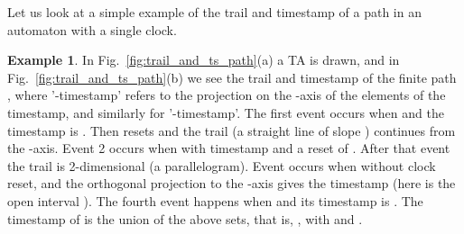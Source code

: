 \documentclass[11pt]{amsart}
\theoremstyle{definition}
\newtheorem{example}[theorem]{Example}
\begin{document}
Let us look at a simple example of the trail and timestamp of a path in an automaton with a single clock.
\begin{example}
	In Fig.~\ref{fig:trail_and_ts_path}(a) a TA is drawn, and in Fig.~\ref{fig:trail_and_ts_path}(b) we see the trail and timestamp of the finite path , where '-timestamp' refers to the projection on the -axis of the elements  of the timestamp, and similarly for '-timestamp'.
	The first event occurs when  and the timestamp is .
	Then  resets and the trail (a straight line of slope ) continues from the -axis.
	Event 2 occurs when  with timestamp  and a reset of .
	After that event the trail is 2-dimensional (a parallelogram).
	Event  occurs when  without clock reset, and the orthogonal projection to the -axis gives the timestamp  (here  is the open interval ).
	The fourth event happens when  and its timestamp is .
	The timestamp of  is the union of the above sets, that is, , with  and .
	\begin{figure}[htb]
\centering
\end{figure}
\end{example}
\end{document}
